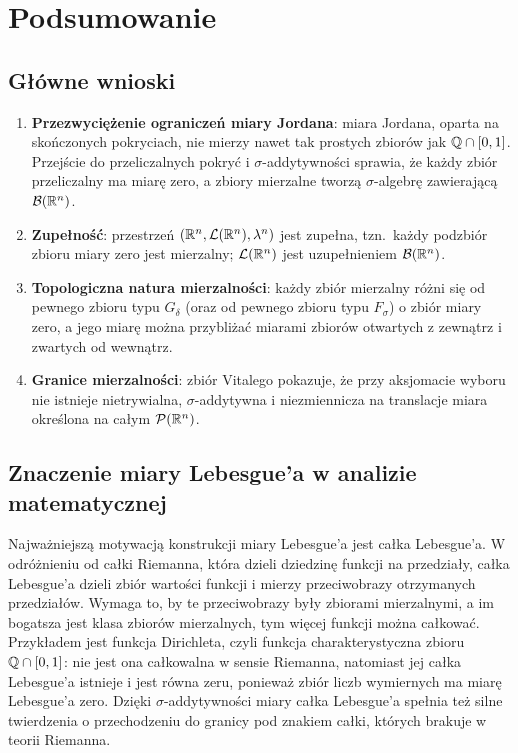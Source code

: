 \section{Podsumowanie}

\subsection{Główne wnioski}

\begin{enumerate}
    \item \textbf{Przezwyciężenie ograniczeń miary Jordana}:
          miara Jordana, oparta na skończonych pokryciach, nie mierzy nawet tak prostych zbiorów jak $\mathbb{Q} \cap [0, 1]$. Przejście do przeliczalnych pokryć i $\sigma$-addytywności sprawia, że każdy zbiór przeliczalny ma miarę zero, a zbiory mierzalne tworzą $\sigma$-algebrę zawierającą $\mathcal{B}({\mathbb{R}^{n}})$.

    \item \textbf{Zupełność}:
          przestrzeń $(\mathbb{R}^{n}, \mathcal{L}({\mathbb{R}^{n}}), \lambda^n)$ jest zupełna, tzn.\ każdy podzbiór zbioru miary zero jest mierzalny; $\mathcal{L}({\mathbb{R}^{n}})$ jest uzupełnieniem $\mathcal{B}({\mathbb{R}^{n}})$.

    \item \textbf{Topologiczna natura mierzalności}:
          każdy zbiór mierzalny różni się od pewnego zbioru typu $G_\delta$ (oraz od pewnego zbioru typu $F_\sigma$) o zbiór miary zero, a jego miarę można przybliżać miarami zbiorów otwartych z zewnątrz i zwartych od wewnątrz.

    \item \textbf{Granice mierzalności}:
          zbiór Vitalego pokazuje, że przy aksjomacie wyboru nie istnieje nietrywialna, $\sigma$-addytywna i niezmiennicza na translacje miara określona na całym $\mathcal{P}(\mathbb{R}^{n})$.
\end{enumerate}

\subsection{Znaczenie miary Lebesgue'a w analizie matematycznej}

Najważniejszą motywacją konstrukcji miary Lebesgue'a jest całka Lebesgue'a. W odróżnieniu od całki Riemanna, która dzieli dziedzinę funkcji na przedziały, całka Lebesgue'a dzieli zbiór wartości funkcji i mierzy przeciwobrazy otrzymanych przedziałów. Wymaga to, by te przeciwobrazy były zbiorami mierzalnymi, a im bogatsza jest klasa zbiorów mierzalnych, tym więcej funkcji można całkować. Przykładem jest funkcja Dirichleta, czyli funkcja charakterystyczna zbioru $\mathbb{Q} \cap [0,1]$: nie jest ona całkowalna w sensie Riemanna, natomiast jej całka Lebesgue'a istnieje i jest równa zeru, ponieważ zbiór liczb wymiernych ma miarę Lebesgue'a zero. Dzięki $\sigma$-addytywności miary całka Lebesgue'a spełnia też silne twierdzenia o przechodzeniu do granicy pod znakiem całki, których brakuje w teorii Riemanna.

